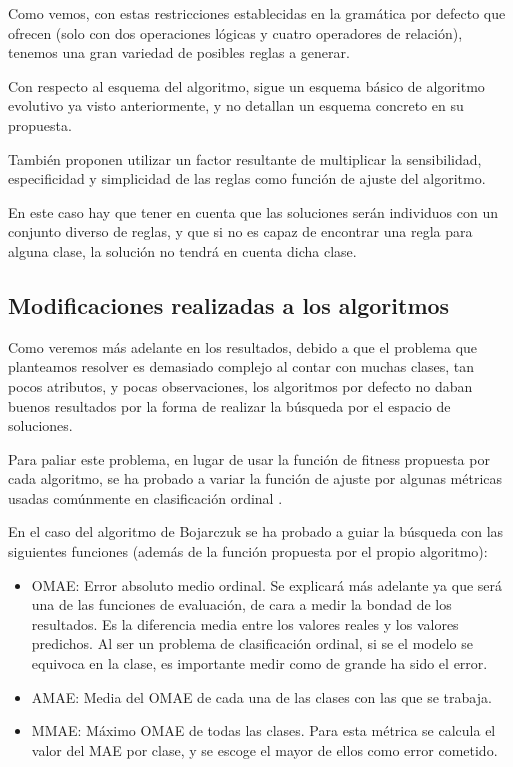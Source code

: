 Como vemos, con estas restricciones establecidas en la gramática por defecto que ofrecen (solo con dos operaciones lógicas y cuatro operadores de relación), tenemos una gran variedad de posibles reglas a generar.

Con respecto al esquema del algoritmo, sigue un esquema básico de algoritmo evolutivo ya visto anteriormente, y no detallan un esquema concreto en su propuesta.

También proponen utilizar un factor resultante de multiplicar la sensibilidad, especificidad y simplicidad de las reglas como función de ajuste del algoritmo.

En este caso hay que tener en cuenta que las soluciones serán individuos con un conjunto diverso de reglas, y que si no es capaz de encontrar una regla para alguna clase, la solución no tendrá en cuenta dicha clase.

\newpage

\subsection{Modificaciones realizadas a los algoritmos}

Como veremos más adelante en los resultados, debido a que el problema que planteamos resolver es demasiado complejo al contar con muchas clases, tan pocos atributos, y pocas observaciones, los algoritmos por defecto no daban buenos resultados por la forma de realizar la búsqueda por el espacio de soluciones.

Para paliar este problema, en lugar de usar la función de fitness propuesta por cada algoritmo, se ha probado a variar la función de ajuste por algunas métricas usadas comúnmente en clasificación ordinal \cite{funcionesClasificacionOrdinal}.

En el caso del algoritmo de Bojarczuk se ha probado a guiar la búsqueda con las siguientes funciones (además de la función propuesta por el propio algoritmo):

\begin{itemize}
	\item OMAE: Error absoluto medio ordinal. Se explicará más adelante ya que será una de las funciones de evaluación, de cara a medir la bondad de los resultados. Es la diferencia media entre los valores reales y los valores predichos. Al ser un problema de clasificación ordinal, si se el modelo se equivoca en la clase, es importante medir como de grande ha sido el error.
	\item AMAE: Media del OMAE de cada una de las clases con las que se trabaja.
	\item MMAE: Máximo OMAE de todas las clases. Para esta métrica se calcula el valor del MAE por clase, y se escoge el mayor de ellos como error cometido.
\end{itemize}


